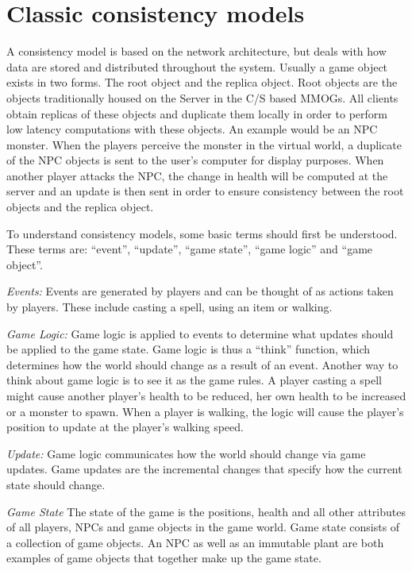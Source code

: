 \documentclass[10pt,a4paper,journal,cspaper,compsoc]{IEEEtran}
\begin{document}
\section{Classic consistency models}
\label{classic_models}

A consistency model is based on the network architecture, but deals with how data are stored and distributed throughout the system. Usually a game
object exists in two forms. The root object and the replica object. Root objects are the objects traditionally housed on the Server in the C/S based
MMOGs. All clients obtain replicas of these objects and duplicate them locally in order to perform low latency computations with these objects. An
example would be an NPC monster. When the players perceive the monster in the virtual world, a duplicate of the NPC objects is sent to the user's
computer for display purposes. When another player attacks the NPC, the change in health will be computed at the server and an update is then sent in
order to ensure consistency between the root objects and the replica object.

To understand consistency models, some basic terms should first be understood. These terms are: ``event'', ``update'', ``game state'', ``game logic''
and ``game object''.

\emph{Events:} Events are generated by players and can be thought of as actions taken by players. These include casting a spell, using an item
    or walking.

\emph{Game Logic:} Game logic is applied to events to determine what updates should be applied to the game state. Game logic is thus a
    ``think'' function, which determines how the world should change as a result of an event. Another way to think about game logic is to see
    it as the game rules. A player casting a spell might cause another player's health to be reduced, her own health to be increased or a
    monster to spawn. When a player is walking, the logic will cause the player's position to update at the player's walking speed.

\emph{Update:} Game logic communicates how the world should change via game updates. Game updates are the incremental changes that specify how
    the current state should change.

\emph{Game State} The state of the game is the positions, health and all other attributes of all players, NPCs and game objects in the game
    world. Game state consists of a collection of game objects. An NPC as well as an immutable plant are both examples of game objects that
    together make up the game state.
\end{document}
